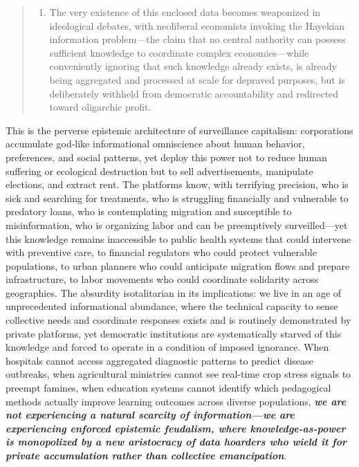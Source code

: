 \begin{quote}
\begin{enumerate}
\def\labelenumi{\arabic{enumi}.}
\setcounter{enumi}{1}
\tightlist
\item
  The very existence of this enclosed data becomes weaponized in
  ideological debates, with neoliberal economists invoking the Hayekian
  information problem---the claim that no central authority can possess
  sufficient knowledge to coordinate complex economies---while
  conveniently ignoring that such knowledge already exists, is already
  being aggregated and processed at scale for depraved purposes, but is
  deliberately withheld from democratic accountability and redirected
  toward oligarchic profit.
\end{enumerate}
\end{quote}

This is the perverse epistemic architecture of surveillance capitalism:
corporations accumulate god-like informational omniscience about human
behavior, preferences, and social patterns, yet deploy this power not to
reduce human suffering or ecological destruction but to sell
advertisements, manipulate elections, and extract rent. The platforms
know, with terrifying precision, who is sick and searching for
treatments, who is struggling financially and vulnerable to predatory
loans, who is contemplating migration and susceptible to misinformation,
who is organizing labor and can be preemptively surveilled---yet this
knowledge remains inaccessible to public health systems that could
intervene with preventive care, to financial regulators who could
protect vulnerable populations, to urban planners who could anticipate
migration flows and prepare infrastructure, to labor movements who could
coordinate solidarity across geographies. The absurdity isotalitarian in
its implications: we live in an age of unprecedented informational
abundance, where the technical capacity to sense collective needs and
coordinate responses exists and is routinely demonstrated by private
platforms, yet democratic institutions are systematically starved of
this knowledge and forced to operate in a condition of imposed
ignorance. When hospitals cannot access aggregated diagnostic patterns
to predict disease outbreaks, when agricultural ministries cannot see
real-time crop stress signals to preempt famines, when education systems
cannot identify which pedagogical methods actually improve learning
outcomes across diverse populations, \textbf{\emph{we are not
experiencing a natural scarcity of information---we are experiencing
enforced epistemic feudalism, where knowledge-as-power is monopolized by
a new aristocracy of data hoarders who wield it for private accumulation
rather than collective emancipation}}.

